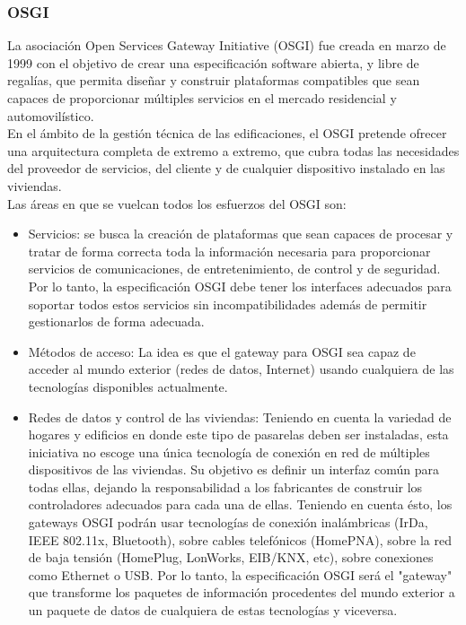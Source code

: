 \subsubsection{OSGI}
La asociación Open Services Gateway Initiative (OSGI) fue creada en marzo de 1999 con el objetivo de crear una especificación software abierta, y libre de regalías, que permita diseñar y construir plataformas compatibles que sean capaces de proporcionar múltiples servicios en el mercado residencial y automovilístico.\\

En el ámbito de la gestión técnica de las edificaciones, el OSGI pretende ofrecer una arquitectura completa de extremo a extremo, que cubra todas las necesidades del proveedor de servicios, del cliente y de cualquier dispositivo instalado en las viviendas.\cite{domoticaoviedo}\\

Las áreas en que se vuelcan todos los esfuerzos del OSGI son:
\begin{itemize}
\item Servicios: se busca la creación de plataformas que sean capaces de procesar y tratar de forma correcta toda la información necesaria para proporcionar servicios de comunicaciones, de entretenimiento, de control y de seguridad. Por lo tanto, la especificación OSGI debe tener los interfaces adecuados para soportar todos estos servicios sin incompatibilidades además de permitir gestionarlos de forma adecuada.
\item Métodos de acceso: La idea es que el gateway para OSGI sea capaz de acceder al mundo exterior (redes de datos, Internet) usando cualquiera de las tecnologías disponibles actualmente. 
\item Redes de datos y control de las viviendas: Teniendo en cuenta la variedad de hogares y edificios en donde este tipo de pasarelas deben ser instaladas, esta iniciativa no escoge una única tecnología de conexión en red de múltiples dispositivos de las viviendas. Su objetivo es definir un interfaz común para todas ellas, dejando la responsabilidad a los fabricantes de construir los controladores adecuados para cada una de ellas. Teniendo en cuenta ésto, los gateways OSGI podrán usar tecnologías de conexión inalámbricas (IrDa, IEEE 802.11x, Bluetooth), sobre cables telefónicos (HomePNA), sobre la red de baja tensión (HomePlug, LonWorks, EIB/KNX, etc), sobre conexiones como Ethernet o USB. Por lo tanto, la especificación OSGI será el "gateway" que transforme los paquetes de información procedentes del mundo exterior a un paquete de datos de cualquiera de estas tecnologías y viceversa.
\end{itemize}

